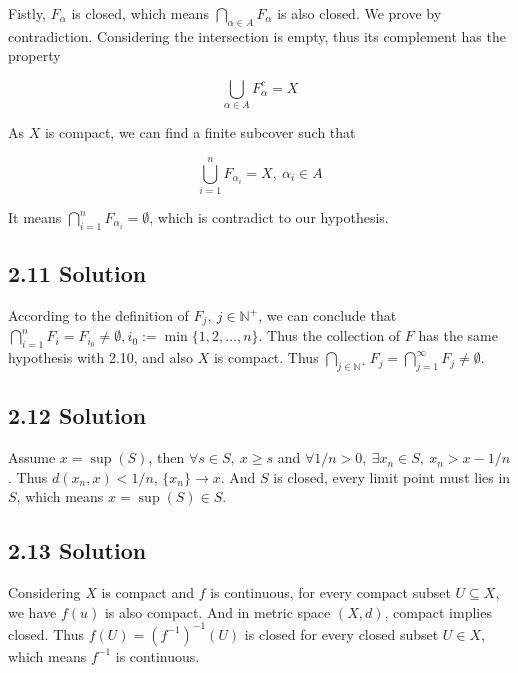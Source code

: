 \documentclass{article}
\begin{document}
Fistly, \(F_\alpha\) is closed, which means \(\bigcap_{\alpha \in A} F_\alpha\) is also closed. We prove by contradiction. Considering the intersection is empty, thus its complement has the property

\[\bigcup_{\alpha \in A}F_\alpha^c = X\]

As \(X\) is compact, we can find a finite subcover such that

\[\bigcup_{i = 1}^n F_{\alpha_i} = X,\ \alpha_i \in A\]

It means \(\bigcap_{i = 1}^n F_{\alpha_i} = \emptyset\), which is contradict to our hypothesis.

\subsection*{2.11 Solution}

According to the definition of \(F_j,\ j \in \mathbb N^+\), we can conclude that \(\bigcap_{i = 1}^n F_i = F_{i_0} \ne \emptyset, i_0 := \min\{1, 2, \ldots, n\}\). Thus the collection of \(F\) has the same hypothesis with 2.10, and also \(X\) is compact. Thus \(\bigcap_{j \in \mathbb N^+} F_j = \bigcap_{j = 1}^\infty F_j \ne \emptyset\).

\subsection*{2.12 Solution}

Assume \(x = \sup(S)\), then \(\forall s \in S,\ x \ge s\) and \(\forall 1/n > 0,\ \exists x_n \in S,\ x_n > x - 1/n\). Thus \(d(x_n, x) < 1/n\), \(\{x_n\} \to x\). And \(S\) is closed, every limit point must lies in \(S\), which means \(x = \sup(S) \in S\).

\subsection*{2.13 Solution}

Considering \(X\) is compact and \(f\) is continuous, for every compact subset \(U \subseteq X\), we have \(f(u)\) is also compact. And in metric space \((X, d)\), compact implies closed. Thus \(f(U) = {(f^{-1})}^{-1} (U)\) is closed for every closed subset \(U \in X\), which means $f^{-1}$ is continuous.
\end{document}
